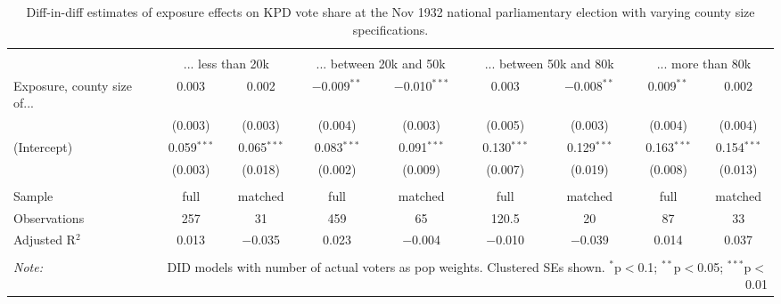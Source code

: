 
\begin{table}[!htbp] \centering 
  \caption{Diff-in-diff estimates of exposure effects on KPD vote share at the Nov 1932 national parliamentary election with varying county size specifications.\vspace{-.25cm}} 
  \label{tab:nsdap-voteshare-kpd-countysize-dd-1932-2} 
\scriptsize 
\begin{tabular}{@{\extracolsep{5pt}}lcccccccc} 
\\[-1.8ex]\hline 
\hline \\[-1.8ex] 
 & \multicolumn{2}{c}{... less than 20k } & \multicolumn{2}{c}{... between 20k and 50k} & \multicolumn{2}{c}{... between 50k and 80k} & \multicolumn{2}{c}{... more than 80k} \\ 
 \cmidrule(r){2-3}\cmidrule(r){4-5}\cmidrule(r){6-7}\cmidrule(r){8-9}Exposure, county size of... & 0.003 & 0.002 & $-$0.009$^{**}$ & $-$0.010$^{***}$ & 0.003 & $-$0.008$^{**}$ & 0.009$^{**}$ & 0.002 \\ 
  & (0.003) & (0.003) & (0.004) & (0.003) & (0.005) & (0.003) & (0.004) & (0.004) \\ 
  (Intercept) & 0.059$^{***}$ & 0.065$^{***}$ & 0.083$^{***}$ & 0.091$^{***}$ & 0.130$^{***}$ & 0.129$^{***}$ & 0.163$^{***}$ & 0.154$^{***}$ \\ 
  & (0.003) & (0.018) & (0.002) & (0.009) & (0.007) & (0.019) & (0.008) & (0.013) \\ 
 \hline \\[-1.8ex] 
Sample & full & matched & full & matched & full & matched & full & matched \\ 
Observations & 257 & 31 & 459 & 65 & 120.5 & 20 & 87 & 33 \\ 
Adjusted R$^{2}$ & 0.013 & $-$0.035 & 0.023 & $-$0.004 & $-$0.010 & $-$0.039 & 0.014 & 0.037 \\ 
\hline 
\hline \\[-1.8ex] 
\textit{Note:}  & \multicolumn{8}{r}{DID models with number of actual voters as pop weights. Clustered SEs shown. $^{*}$p$<$0.1; $^{**}$p$<$0.05; $^{***}$p$<$0.01} \\ 
\end{tabular} 
\end{table} 
